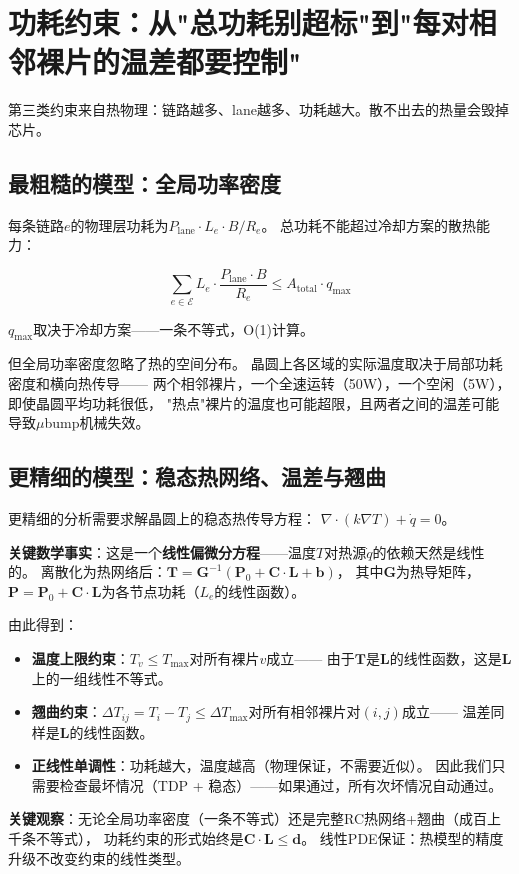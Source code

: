\section{功耗约束：从"总功耗别超标"到"每对相邻裸片的温差都要控制"}

第三类约束来自热物理：链路越多、lane越多、功耗越大。散不出去的热量会毁掉芯片。

\subsection{最粗糙的模型：全局功率密度}

每条链路$e$的物理层功耗为$P_{\text{lane}} \cdot L_e \cdot B/R_e$。
总功耗不能超过冷却方案的散热能力：

\begin{equation}\label{eq:thermal-l0}
    \sum_{e \in \mathcal{E}} L_e \cdot \frac{P_{\text{lane}} \cdot B}{R_e} \le A_{\text{total}} \cdot q_{\max}
\end{equation}

$q_{\max}$取决于冷却方案——一条不等式，O(1)计算。

但全局功率密度忽略了热的空间分布。
晶圆上各区域的实际温度取决于局部功耗密度和横向热传导——
两个相邻裸片，一个全速运转（50W），一个空闲（5W），即使晶圆平均功耗很低，
"热点"裸片的温度也可能超限，且两者之间的温差可能导致$\mu$bump机械失效。

\subsection{更精细的模型：稳态热网络、温差与翘曲}

更精细的分析需要求解晶圆上的稳态热传导方程：
$\nabla \cdot (k \nabla T) + \dot{q} = 0$。

\textbf{关键数学事实}：这是一个\textbf{线性偏微分方程}——温度$T$对热源$\dot{q}$的依赖天然是线性的。
离散化为热网络后：$\mathbf{T} = \mathbf{G}^{-1}(\mathbf{P}_0 + \mathbf{C} \cdot \mathbf{L} + \mathbf{b})$，
其中$\mathbf{G}$为热导矩阵，$\mathbf{P} = \mathbf{P}_0 + \mathbf{C} \cdot \mathbf{L}$为各节点功耗（$L_e$的线性函数）。

由此得到：
\begin{itemize}
    \item \textbf{温度上限约束}：$T_v \le T_{\max}$对所有裸片$v$成立——
    由于$\mathbf{T}$是$\mathbf{L}$的线性函数，这是$\mathbf{L}$上的一组线性不等式。
    \item \textbf{翘曲约束}：$\Delta T_{ij} = T_i - T_j \le \Delta T_{\max}$对所有相邻裸片对$(i,j)$成立——
    温差同样是$\mathbf{L}$的线性函数。
    \item \textbf{正线性单调性}：功耗越大，温度越高（物理保证，不需要近似）。
    因此我们只需要检查最坏情况（TDP + 稳态）——如果通过，所有次坏情况自动通过。
\end{itemize}

\textbf{关键观察}：无论全局功率密度（一条不等式）还是完整RC热网络+翘曲（成百上千条不等式），
功耗约束的形式始终是$\mathbf{C} \cdot \mathbf{L} \le \mathbf{d}$。
线性PDE保证：热模型的精度升级不改变约束的线性类型。
